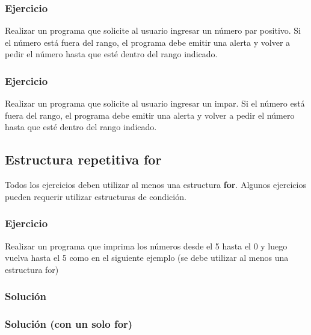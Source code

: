 \subsubsection{Ejercicio}
Realizar un programa que solicite al usuario ingresar un número par positivo. Si el número está fuera del rango, el programa debe emitir una alerta y volver a pedir el número hasta que esté dentro del rango indicado.

\subsubsection{Ejercicio}
Realizar un programa que solicite al usuario ingresar un impar. Si el número está fuera del rango, el programa debe emitir una alerta y volver a pedir el número hasta que esté dentro del rango indicado.

\subsection*{Estructura repetitiva for}
Todos los ejercicios deben utilizar al menos una estructura \textbf{for}.
Algunos ejercicios pueden requerir utilizar estructuras de condición.

\subsubsection{Ejercicio}
Realizar un programa que imprima los números desde el 5 hasta el 0 y luego vuelva hasta el 5 como en el siguiente ejemplo (se debe utilizar al menos una estructura for)

\subsubsection{Solución}

\lstset{inputencoding=utf8/latin1}

{\small
  \lstset{inputencoding=utf8/latin1}
  
}
\subsubsection{Solución (con un solo for)}

{\small
  \lstset{inputencoding=utf8/latin1}
  
}

